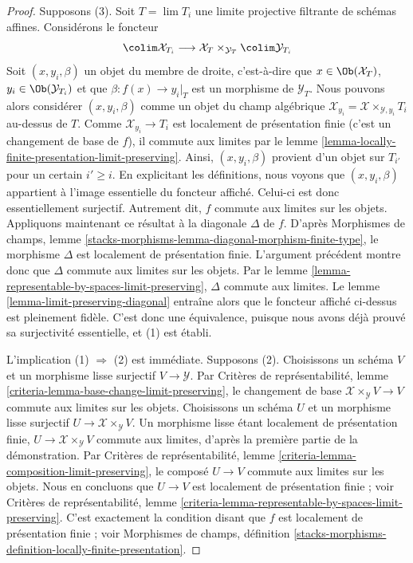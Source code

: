 \begin{proof}
Supposons (3). Soit $T = \lim T_i$ une limite projective filtrante de schémas
affines. Considérons le foncteur
$$
\colim \mathcal{X}_{T_i} \longrightarrow
\mathcal{X}_T \times_{\mathcal{Y}_T} \colim \mathcal{Y}_{T_i}
$$
Soit $(x, y_i, \beta)$ un objet du membre de droite, c'est-à-dire que
$x \in \Ob(\mathcal{X}_T)$, $y_i \in \Ob(\mathcal{Y}_{T_i})$ et que
$\beta : f(x) \to y_i|_T$ est un morphisme de $\mathcal{Y}_T$. Nous pouvons
alors considérer $(x, y_i, \beta)$ comme un objet du champ algébrique
$\mathcal{X}_{y_i} = \mathcal{X} \times_{\mathcal{Y}, y_i} T_i$ au-dessus de
$T$. Comme
$\mathcal{X}_{y_i} \to T_i$ est localement de présentation finie (c'est un
changement de base de $f$), il commute aux limites par le lemme
\ref{lemma-locally-finite-presentation-limit-preserving}. Ainsi,
$(x, y_i, \beta)$ provient d'un objet sur $T_{i'}$ pour un certain
$i' \geq i$. En explicitant les définitions, nous voyons que
$(x, y_i, \beta)$ appartient à l'image essentielle du foncteur affiché.
Celui-ci est donc essentiellement surjectif. Autrement dit, $f$ commute aux
limites sur les objets. Appliquons maintenant ce résultat à la diagonale
$\Delta$ de $f$. D'après Morphismes de champs, lemme
\ref{stacks-morphisms-lemma-diagonal-morphism-finite-type}, le morphisme
$\Delta$ est localement de présentation finie. L'argument précédent montre
donc que $\Delta$ commute aux limites sur les objets. Par le lemme
\ref{lemma-representable-by-spaces-limit-preserving}, $\Delta$ commute aux limites.
Le lemme \ref{lemma-limit-preserving-diagonal} entraîne alors que le foncteur
affiché ci-dessus est pleinement fidèle. C'est donc une équivalence, puisque
nous avons déjà prouvé sa surjectivité essentielle, et (1) est établi.

\medskip\noindent
L'implication (1) $\Rightarrow$ (2) est immédiate. Supposons (2). Choisissons
un schéma $V$ et un morphisme lisse surjectif $V \to \mathcal{Y}$. Par
Critères de représentabilité, lemme
\ref{criteria-lemma-base-change-limit-preserving}, le changement de base
$\mathcal{X} \times_\mathcal{Y} V \to V$ commute aux limites sur les objets.
Choisissons un schéma $U$ et un morphisme lisse surjectif
$U \to \mathcal{X} \times_\mathcal{Y} V$. Un morphisme lisse étant localement
de présentation finie, $U \to \mathcal{X} \times_\mathcal{Y} V$ commute aux
limites, d'après la première partie de la démonstration. Par Critères de
représentabilité, lemme \ref{criteria-lemma-composition-limit-preserving}, le
composé $U \to V$ commute aux limites sur les objets. Nous en concluons que
$U \to V$ est localement de présentation finie ; voir Critères de
représentabilité, lemme
\ref{criteria-lemma-representable-by-spaces-limit-preserving}. C'est exactement
la condition disant que $f$ est localement de présentation finie ; voir
Morphismes de champs, définition
\ref{stacks-morphisms-definition-locally-finite-presentation}.
\end{proof}




